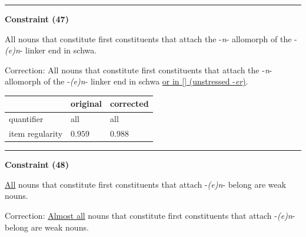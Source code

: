 \vspace{-0.75em}
\hrule




\vspace{0.6em}

\begin{center}
\textbf{Constraint (47)}
\end{center}

\noindent
All nouns that constitute first constituents that attach the -\textit{n}- allomorph of the -\textit{(e)n}- linker end in schwa.
\vspace{0.3em}

\noindent
Correction: All nouns that constitute first constituents that attach the -\textit{n}- allomorph of the -\textit{(e)n}- linker end in schwa \underline{or in [{\textscripta}] (unstressed -\textit{er})}.

\vspace{-0.25em}

\begin{table}[!ht]

\begin{center}

\begin{tabularx}{\columnwidth}{|X|X|X|}
      \hline
                        & original      & corrected \\
      \hline
      quantifier        & all      & all   \\
      \hline
      item regularity   & $0.959$      & $0.988$   \\
      \hline
\end{tabularx}
\end{center}
\end{table}

\vspace{-0.75em}
\hrule




\vspace{0.6em}

\begin{center}
\textbf{Constraint (48)}
\end{center}

\noindent
\underline{All} nouns that constitute first constituents that attach -\textit{(e)n}- belong are weak nouns.
\vspace{0.3em}

\noindent
Correction: \underline{Almost all} nouns that constitute first constituents that attach -\textit{(e)n}- belong are weak nouns.

